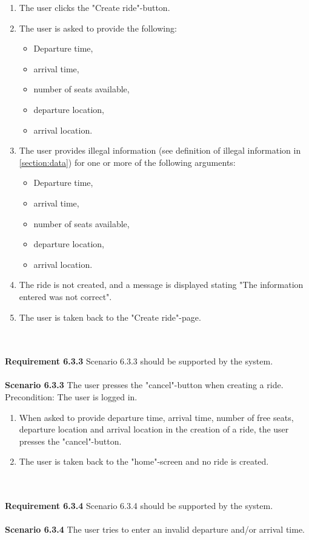 \documentclass{article}
\begin{document}
\begin{enumerate}
    \item The user clicks the "Create ride"-button.
    \item The user is asked to provide the following:
        \begin{itemize}
            \item Departure time,
            \item arrival time, 
            \item number of seats available, 
            \item departure location,
            \item arrival location. 
        \end{itemize}
    \item The user provides illegal information (see definition of illegal information in \ref{section:data})  for one or more of the following arguments:
            \begin{itemize}
            \item Departure time,
            \item arrival time, 
            \item number of seats available, 
            \item departure location,
            \item arrival location. 
        \end{itemize}
    \item The ride is not created, and a message is displayed stating "The information entered was not correct".  
    \item The user is taken back to the "Create ride"-page.
    
\end{enumerate}
\mbox{}\\ \\
\textbf{Requirement 6.3.3} Scenario 6.3.3 should be supported by the system.
\\ \\
\textbf{Scenario 6.3.3} The user presses the "cancel"-button when creating a ride. Precondition: The user is logged in.

\begin{enumerate}
    \item When asked to provide departure time, arrival time, number of free seats, departure location and arrival location in the creation of a ride, the user presses the "cancel"-button.
    \item The user is taken back to the "home"-screen and no ride is created.
\end{enumerate}
\mbox{}\\ \\
\textbf{Requirement 6.3.4} Scenario 6.3.4 should be supported by the system.
\\ \\
\textbf{Scenario 6.3.4} The user tries to enter an invalid departure and/or arrival time.
\end{document}
